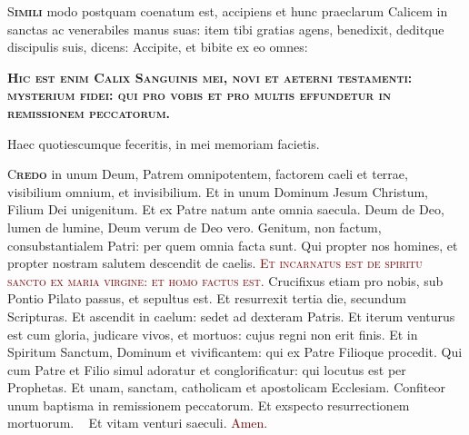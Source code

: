 \documentclass[12pt,a3paper, landscape]{scrartcl}
\newcommand{\krzyz}{\textcolor{red}{\raisebox{-1mm}{\scalebox{1.5}{\ding{64}}}}}
\newcommand{\amen}{\textcolor{Maroon}{Amen.}}
\newcommand{\initial}[2]{\lettrine[lines=3]{\color{Maroon}#1}{\bfseries\color{Maroon}#2}}
\newcommand{\gap}{\vspace*{0.1cm}}
\begin{document}
\begin{center}
\begin{minipage}[t]{0.28\linewidth}
        \gap

        \initial{S}{imili} modo postquam coenatum est, accipiens et hunc
        praeclarum Calicem in sanctas ac venerabiles manus suas: item tibi
        gratias agens, bene\krzyz dixit, deditque discipulis suis, dicens:
        Accipite, et bibite ex eo omnes:

        \gap

        \begin{center}
            \Large\color{Maroon}

            \begin{minipage}{0.8\linewidth}
                \begin{center}
                    \textbf{\textsc{Hic est enim Calix Sanguinis mei, novi et aeterni
                            testamenti: mysterium fidei: qui pro vobis et pro multis
                            effundetur in remissionem peccatorum.}}
                \end{center}
            \end{minipage}
        \end{center}

        \gap

        \hspace*{-2.1em} Haec quotiescumque feceritis, in mei memoriam facietis.

    \end{minipage}
    \hspace*{0.2cm}
    \begin{minipage}[t]{0.28\linewidth}

        \vspace*{2.2cm}

        \initial{C}{redo} in unum Deum, Patrem omnipotentem, factorem caeli et
        terrae, visibilium omnium, et invisibilium. Et in unum Dominum Jesum
        Christum, Filium Dei unigenitum. Et ex Patre natum ante omnia saecula.
        Deum de Deo, lumen de lumine, Deum verum de Deo vero. Genitum, non
        factum, consubstantialem Patri: per quem omnia facta sunt. Qui propter
        nos homines, et propter nostram salutem descendit de caelis.
        \textcolor{Maroon}{\textsc{Et incarnatus est de spiritu sancto ex maria
        virgine: et homo factus est}.}
        Crucifixus etiam pro nobis, sub Pontio Pilato passus, et sepultus est.
        Et resurrexit tertia die, secundum Scripturas. Et ascendit in caelum:
        sedet ad dexteram Patris. Et iterum venturus est cum gloria, judicare
        vivos, et mortuos: cujus regni non erit finis. Et in Spiritum Sanctum,
        Dominum et vivificantem: qui ex Patre Filioque procedit. Qui cum Patre
        et Filio simul adoratur et conglorificatur: qui locutus est per
        Prophetas. Et unam, sanctam, catholicam et apostolicam Ecclesiam.
        Confiteor unum baptisma in remissionem peccatorum. Et exspecto
        resurrectionem mortuorum. \krzyz~ Et vitam venturi saeculi.
        \amen


\end{minipage}
\end{center}
\end{document}
